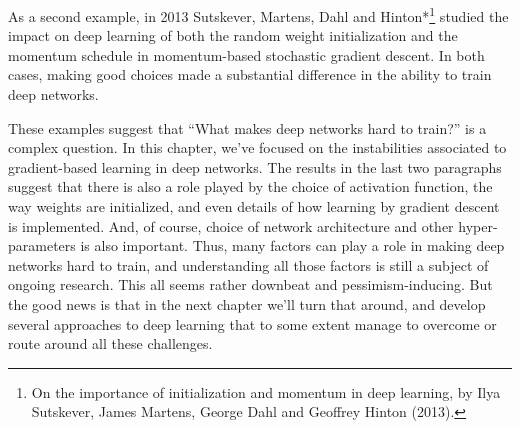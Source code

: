 As a second example, in 2013 Sutskever, Martens, Dahl and Hinton*\footnote{On the importance of initialization and momentum in deep learning, by Ilya Sutskever, James Martens, George Dahl and Geoffrey Hinton (2013).} studied the impact on deep learning of both the random weight initialization and the momentum schedule in momentum-based stochastic gradient descent. In both cases, making good choices made a substantial difference in the ability to train deep networks.


These examples suggest that ``What makes deep networks hard to train?'' is a complex question. In this chapter, we've focused on the instabilities associated to gradient-based learning in deep networks. The results in the last two paragraphs suggest that there is also a role played by the choice of activation function, the way weights are initialized, and even details of how learning by gradient descent is implemented. And, of course, choice of network architecture and other hyper-parameters is also important. Thus, many factors can play a role in making deep networks hard to train, and understanding all those factors is still a subject of ongoing research. This all seems rather downbeat and pessimism-inducing. But the good news is that in the next chapter we'll turn that around, and develop several approaches to deep learning that to some extent manage to overcome or route around all these challenges.
